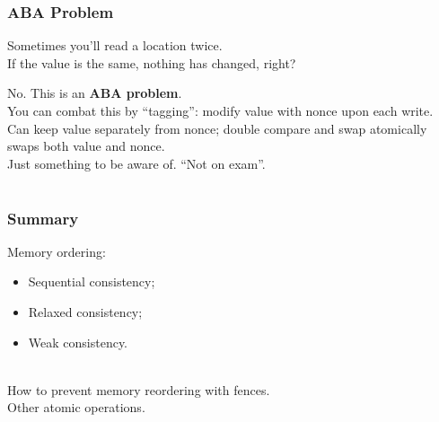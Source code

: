 \documentclass[aspectratio=43]{beamer}
\newenvironment{changemargin}[1]{%
  \begin{list}{}{%
    \setlength{\topsep}{0pt}%
    \setlength{\leftmargin}{#1}%
    \setlength{\rightmargin}{1em}
    \setlength{\listparindent}{\parindent}%
    \setlength{\itemindent}{\parindent}%
    \setlength{\parsep}{\parskip}%
  }%
  \item[]}{\end{list}}
\begin{document}
\begin{frame}[fragile]
  \frametitle{ABA Problem}

  \begin{changemargin}{1.5cm}
    Sometimes you'll read a location twice.\\[1em]

    If the value is the same, nothing has changed, right?

    \pause

    \alert{No.} This is an {\bf ABA problem}.\\[1em]

    You can combat this by ``tagging'': modify value with nonce upon each write.\\[1em]

    Can keep value separately from nonce; double compare and swap atomically swaps both value and nonce.\\[2em]

    Just something to be aware of. ``Not on exam''.
  \end{changemargin}
\end{frame}

\section{}
\begin{frame}
  \frametitle{Summary}
  \begin{changemargin}{1.5cm}
 Memory ordering:
      \begin{itemize}
        \item Sequential consistency;
        \item Relaxed consistency;
        \item Weak consistency.
      \end{itemize}~\\

 How to prevent memory reordering with fences.\\

 Other atomic operations.\\
  \end{changemargin}
\end{frame}
\end{document}

